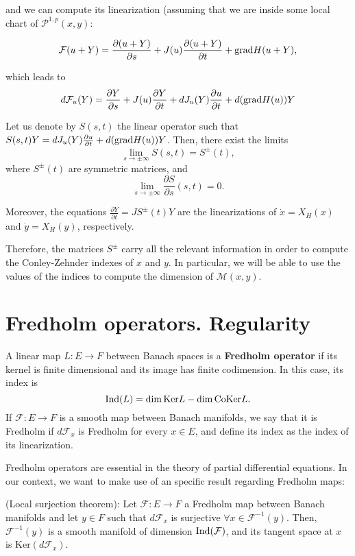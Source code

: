 and we can compute its linearization (assuming that we are inside some local chart of $\mathcal{P}^{1,p}(x,y)$:

\[\mathcal{F}(u+Y) = \frac{\partial (u + Y)}{\partial s} + J(u) \frac{\partial (u + Y)}{\partial t}  + \mathrm{grad} H(u + Y) ,\]

which leads to
\[d\mathcal{F}_u(Y) = \frac{\partial Y}{\partial s} + J(u) \frac{\partial Y}{\partial t} + dJ_u(Y) \frac{\partial u}{\partial t} + d(\mathrm{grad} H(u)) Y\]

\begin{prop}
Let us denote by $S(s,t)$ the linear operator such that $S(s,t)Y = dJ_u(Y) \frac{\partial u}{\partial t} + d(\mathrm{grad} H(u))Y$. Then, there exist the limits
\[\lim_{s \rightarrow \pm \infty} S(s,t) = S^{\pm}(t) ,\]
where $S^{\pm}(t)$ are symmetric matrices, and
\[\lim_{s \rightarrow \pm \infty} \frac{\partial S}{\partial s} (s,t) = 0 .\]

Moreover, the equations $\frac{\partial Y}{\partial t} = J S^{\pm}(t)Y$ are the linearizations of $\dot{x} = X_H(x)$ and $\dot{y} = X_H(y)$, respectively.
\end{prop}

Therefore, the matrices $S^{\pm}$ carry all the relevant information in order to compute the Conley-Zehnder indexes of $x$ and $y$. In particular, we will be able to use the values of the indices to compute the dimension of $\mathcal{M}(x,y)$.

\section{Fredholm operators. Regularity}

\begin{deff}
A linear map $L : E \rightarrow F$ between Banach spaces is a {\bf Fredholm operator} if its kernel is finite dimensional and its image has finite codimension. In this case, its index is
\[\mathrm{Ind}(L) = \dim \mathrm{Ker} L - \dim \mathrm{CoKer} L .\]
If $\mathcal{F} : E \rightarrow F$ is a smooth map between Banach manifolds, we say that it is Fredholm if $d\mathcal{F}_x$ is Fredholm for every $x \in E$, and define its index as the index of its linearization.
\end{deff}

Fredholm operators are essential in the theory of partial differential equations. In our context, we want to make use of an specific result regarding Fredholm maps:

\begin{theo} \label{theo:local_surjection} (Local surjection theorem): Let $\mathcal{F} : E \rightarrow F$ a Fredholm map between Banach manifolds and let $y \in F$ such that $d\mathcal{F}_x$ is surjective $\forall x \in \mathcal{F}^{-1}(y)$. Then, $\mathcal{F}^{-1}(y)$ is a smooth manifold of dimension $\mathrm{Ind}(\mathcal{F})$, and its tangent space at $x$ is $\mathrm{Ker}(d\mathcal{F}_x)$.
\end{theo}

